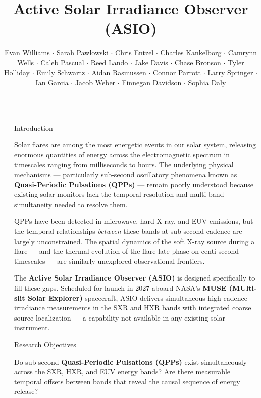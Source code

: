 \documentclass[final]{beamer}
\title{Active Solar Irradiance Observer \textcolor{accent}{(ASIO)}}
\author{%
  Evan Williams $\cdot$ Sarah Pawlowski $\cdot$ Chris Entzel $\cdot$
  Charles Kankelborg $\cdot$ Camrynn Wells $\cdot$ Caleb Pascual $\cdot$
  Reed Lando $\cdot$ Jake Davis $\cdot$ Chase Bronson $\cdot$
  Tyler Holliday $\cdot$ Emily Schwartz $\cdot$ Aidan Rasmussen $\cdot$
  Connor Parrott $\cdot$ Larry Springer $\cdot$ Ian Garcia $\cdot$
  Jacob Weber $\cdot$ Finnegan Davidson $\cdot$ Sophia Daly}
\institute[MSU]{%
  Montana State University $-$ Department of Physics $-$
  Space Science \& Engineering Laboratory}
\newlength{\sepwidth}
\newlength{\colwidth}
\newcommand{\separatorcolumn}{\begin{column}{\sepwidth}\end{column}}
\newcommand{\rqitem}[2]{%
  \vspace{4pt}\noindent
  \fcolorbox{accent}{accent}{%
    \color{white}\bfseries\small\,#1\,}%
  \hspace{6pt}%
  \begin{minipage}[t]{0.87\linewidth}
    \small #2
  \end{minipage}\par\vspace{6pt}%
}
\begin{document}
\begin{frame}[t]
\begin{columns}[t]
\separatorcolumn

\begin{column}{\colwidth}

  \begin{block}{Introduction}

    Solar flares are among the most energetic events in our solar system,
    releasing enormous quantities of energy across the electromagnetic
    spectrum in timescales ranging from milliseconds to hours. The underlying
    physical mechanisms --- particularly sub-second oscillatory phenomena
    known as \textbf{\textcolor{accentdark}{Quasi-Periodic Pulsations
    (QPPs)}} --- remain poorly understood because existing solar monitors
    lack the temporal resolution and multi-band simultaneity needed to
    resolve them.

    \vspace{6pt}
    QPPs have been detected in microwave, hard X-ray, and EUV emissions, but
    the temporal relationships \textit{between} these bands at sub-second
    cadence are largely unconstrained. The spatial dynamics of the soft X-ray
    source during a flare --- and the thermal evolution of the flare late
    phase on centi-second timescales --- are similarly unexplored
    observational frontiers.

    \vspace{6pt}
    The \textbf{\textcolor{accentdark}{Active Solar Irradiance Observer
    (ASIO)}} is designed specifically to fill these gaps. Scheduled for
    launch in 2027 aboard NASA's \textbf{\textcolor{accentdark}{MUSE
    (MUlti-slit Solar Explorer)}} spacecraft, ASIO delivers simultaneous
    high-cadence irradiance measurements in the SXR and HXR bands with
    integrated coarse source localization --- a capability not available in
    any existing solar instrument.

  \end{block}

  \begin{block}{Research Objectives}

    \rqitem{1}{Do sub-second \textbf{\textcolor{accentdark}{Quasi-Periodic
      Pulsations (QPPs)}} exist simultaneously across the SXR, HXR, and EUV
      energy bands? Are there measurable temporal offsets between bands that
      reveal the causal sequence of energy release?}


\end{block}
\end{column}
\end{columns}
\end{frame}
\end{document}
